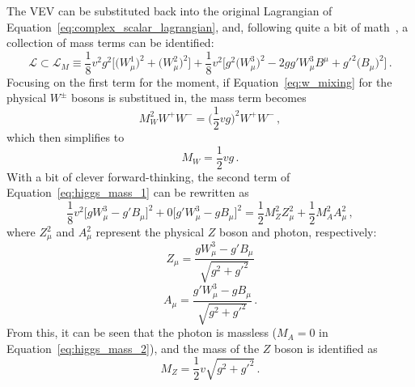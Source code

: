 The VEV can be substituted back into the original Lagrangian of Equation~\ref{eq:complex_scalar_lagrangian}, and, following quite a bit of math~\cite{1984.halzen-martin}, a collection of mass terms can be identified:
\begin{equation}
  \mathcal{L} \subset \mathcal{L}_M \equiv \frac{1}{8}v^{2}g^{2}\bigg[\big(W_{\mu}^1\big)^2 + \big(W_{\mu}^2\big)^2\bigg] + \frac{1}{8}v^2\bigg[g^{2}\big(W_{\mu}^3\big)^2 - 2gg'W_{\mu}^{3}B^{\mu} + g'^{2}\big(B_{\mu}\big)^{2}\bigg]\,.
  \label{eq:higgs_mass_1}
\end{equation}
Focusing on the first term for the moment, if Equation~\ref{eq:w_mixing} for the physical $W^\pm$ bosons is substitued in, the mass term becomes
\begin{equation}
  M_W^{2}W^{+}W^{-} = \bigg(\frac{1}{2}vg\bigg)^{2}W^{+}W^{-}\,,
\end{equation}
which then simplifies to
\begin{equation}
  M_W = \frac{1}{2}vg\,.
\end{equation}
With a bit of clever forward-thinking, the second term of Equation~\ref{eq:higgs_mass_1} can be rewritten as
\begin{equation}
  \frac{1}{8}v^{2}\bigg[gW_{\mu}^{3} - g'B_{\mu}\bigg]^2 + 0\bigg[g'W_{\mu}^{3} - gB_{\mu}\bigg]^2 =  \frac{1}{2}M_{Z}^{2}Z_{\mu}^{2} + \frac{1}{2}M_{A}^{2}A_{\mu}^{2}\,,
  \label{eq:higgs_mass_2}
\end{equation}
where $Z_{\mu}^{2}$ and $A_{\mu}^2$ represent the physical $Z$ boson and photon, respectively:
\begin{equation}
 Z_{\mu} = \frac{gW_{\mu}^{3} - g'B_{\mu}}{\sqrt{g^2+g'^2}}
  \label{eq:higgs_z}
\end{equation}
\begin{equation}
  A_{\mu} = \frac{g'W_{\mu}^{3} - gB_{\mu}}{\sqrt{g^2+g'^2}}\,.
  \label{eq:higgs_a}
\end{equation}
From this, it can be seen that the photon is massless ($M_A = 0$ in Equation~\ref{eq:higgs_mass_2}), and the mass of the $Z$ boson is identified as
\begin{equation}
  M_Z = \frac{1}{2}v\sqrt{g^2+g'^2}\,.
\end{equation}

